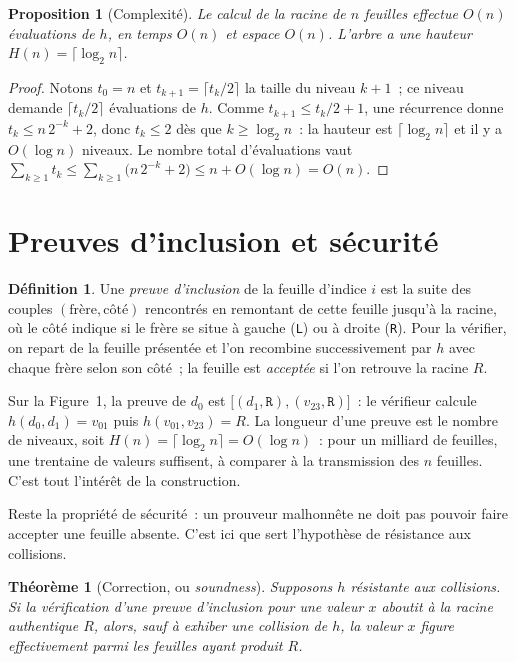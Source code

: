 \documentclass[11pt,a4paper]{article}
\theoremstyle{definition}\newtheorem{definition}{Définition}
\theoremstyle{plain}\newtheorem{theoreme}{Théorème}\newtheorem{proposition}{Proposition}\newtheorem{lemme}{Lemme}
\theoremstyle{remark}\newtheorem{remarque}{Remarque}
\begin{document}
\begin{proposition}[Complexité]\label{prop:complexite}
Le calcul de la racine de $n$ feuilles effectue $O(n)$ évaluations de $h$, en temps $O(n)$ et
espace $O(n)$. L'arbre a une hauteur $H(n) = \lceil \log_2 n \rceil$.
\end{proposition}

\begin{proof}
Notons $t_0 = n$ et $t_{k+1} = \lceil t_k/2 \rceil$ la taille du niveau $k+1$~; ce niveau demande
$\lceil t_k / 2 \rceil$ évaluations de $h$. Comme $t_{k+1} \le t_k/2 + 1$, une récurrence donne
$t_k \le n\,2^{-k} + 2$, donc $t_k \le 2$ dès que $k \ge \log_2 n$~: la hauteur est
$\lceil \log_2 n\rceil$ et il y a $O(\log n)$ niveaux. Le nombre total d'évaluations vaut
$\sum_{k \ge 1} t_k \le \sum_{k\ge 1}\bigl(n\,2^{-k} + 2\bigr) \le n + O(\log n) = O(n)$.
\end{proof}

\section{Preuves d'inclusion et sécurité}

\begin{definition}
Une \emph{preuve d'inclusion} de la feuille d'indice $i$ est la suite des couples
$(\text{fr\`ere}, \text{côté})$ rencontrés en remontant de cette feuille jusqu'à la racine, où le
côté indique si le frère se situe à gauche (\texttt{L}) ou à droite (\texttt{R}). Pour la
vérifier, on repart de la feuille présentée et l'on recombine successivement par $h$ avec chaque
frère selon son côté~; la feuille est \emph{acceptée} si l'on retrouve la racine $R$.
\end{definition}

Sur la Figure~1, la preuve de $d_0$ est $\bigl[(d_1,\texttt{R}),(v_{23},\texttt{R})\bigr]$~: le
vérifieur calcule $h(d_0, d_1) = v_{01}$ puis $h(v_{01}, v_{23}) = R$. La longueur d'une preuve
est le nombre de niveaux, soit $H(n) = \lceil \log_2 n\rceil = O(\log n)$~: pour un milliard de
feuilles, une trentaine de valeurs suffisent, à comparer à la transmission des $n$ feuilles. C'est
tout l'intérêt de la construction.

Reste la propriété de sécurité~: un prouveur malhonnête ne doit pas pouvoir faire accepter une
feuille absente. C'est ici que sert l'hypothèse de résistance aux collisions.

\begin{theoreme}[Correction, ou \emph{soundness}]\label{th:soundness}
Supposons $h$ résistante aux collisions. Si la vérification d'une preuve d'inclusion pour une
valeur $x$ aboutit à la racine authentique $R$, alors, sauf à exhiber une collision de $h$, la
valeur $x$ figure effectivement parmi les feuilles ayant produit $R$.
\end{theoreme}
\end{document}
